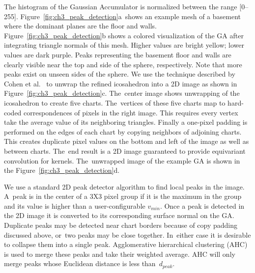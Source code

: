 The histogram of the Gaussian Accumulator is normalized between the range [0--255]. Figure~\ref{fig:ch3_peak_detection}a~shows an example mesh of a basement where the dominant planes are the floor and walls. Figure~\ref{fig:ch3_peak_detection}b shows a colored visualization of the GA after integrating triangle normals of this mesh. Higher values are bright yellow; lower values are dark purple. Peaks representing the basement floor and walls are clearly visible near the top and side of the sphere, respectively. Note that more peaks exist on unseen sides of the sphere. We use the technique described by Cohen et al.~\cite{cohen_gauge_2019} to unwrap the refined icosahedron into a 2D image as shown in Figure~\ref{fig:ch3_peak_detection}c.  The~center image shows unwrapping of the icosahedron to create  five charts. The~vertices of these five charts map to hard-coded correspondences of pixels in the right image. This requires every vertex take the average value of its neighboring triangles. Finally a one-pixel padding is performed on the edges of each chart by copying neighbors of adjoining charts. This creates duplicate pixel values on the bottom and left of the image as well as between charts. The~end result is a 2D image guaranteed to provide equivariant convolution for kernels. The~unwrapped image of the example GA is shown in the Figure~\ref{fig:ch3_peak_detection}d.  



We use a standard 2D peak detector algorithm to find local peaks in the image. A~peak is in the center of a 3X3 pixel group if it is the maximum in the group and its value is higher than a user-configurable $v_{min}$. Once a peak is detected in the 2D image it is converted to its corresponding surface normal on the GA. Duplicate peaks may be detected near chart borders because of copy padding discussed above, or~two peaks may be close together. In~either case it is desirable to collapse them into a single peak.  Agglomerative hierarchical clustering (AHC) is used to merge these peaks and take their weighted average. AHC will only merge peaks whose Euclidean distance is less than~$d_{peak}$. 

